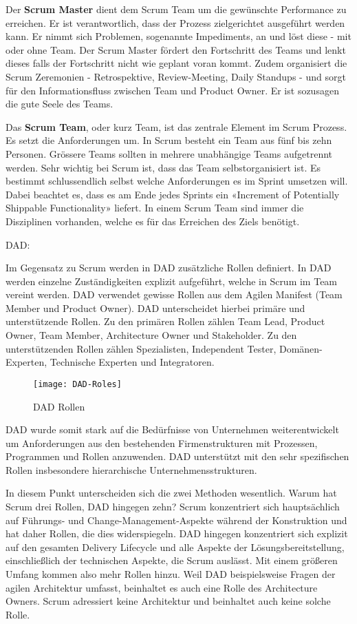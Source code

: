 Der \textbf{Scrum Master} dient dem Scrum Team um die gewünschte Performance zu erreichen. Er ist verantwortlich, dass der Prozess zielgerichtet ausgeführt werden kann. Er nimmt sich Problemen, sogenannte Impediments, an und löst diese - mit oder ohne Team. Der Scrum Master fördert den Fortschritt des Teams und lenkt dieses falls der Fortschritt nicht wie geplant voran kommt. Zudem organisiert die Scrum Zeremonien - Retrospektive, Review-Meeting, Daily Standups - und sorgt für den Informationsfluss zwischen Team und Product Owner. Er ist sozusagen die gute Seele des Teams. \medskip

Das \textbf{Scrum Team}, oder kurz Team, ist das zentrale Element im Scrum Prozess. Es setzt die Anforderungen um. In Scrum besteht ein Team aus fünf bis zehn Personen. Grössere Teams sollten in mehrere unabhängige Teams aufgetrennt werden. Sehr wichtig bei Scrum ist, dass das Team selbstorganisiert ist. Es bestimmt schlussendlich selbst welche Anforderungen es im Sprint umsetzen will. Dabei beachtet es, dass es am Ende jedes Sprints ein «Increment of  Potentially Shippable Functionality» liefert. In einem Scrum Team sind immer die Disziplinen vorhanden, welche es für das Erreichen des Ziels benötigt.
\bigskip 

{\Large DAD:} \medskip

Im Gegensatz zu Scrum werden in DAD zusätzliche Rollen definiert. In DAD werden einzelne Zuständigkeiten explizit aufgeführt, welche in Scrum im Team vereint werden. DAD verwendet gewisse Rollen aus dem Agilen Manifest (Team Member und Product Owner). DAD unterscheidet hierbei primäre und unterstützende Rollen. Zu den primären Rollen zählen Team Lead, Product Owner, Team Member, Architecture Owner und Stakeholder. Zu den unterstützenden Rollen zählen Spezialisten, Independent Tester, Domänen-Experten, Technische Experten und Integratoren.
\begin{figure}[H]
	\centering
	\texttt{[image: DAD-Roles]}
	\caption{DAD Rollen}
	\label{fig:dadrollen}
\end{figure}

DAD wurde somit stark auf die Bedürfnisse von Unternehmen weiterentwickelt um Anforderungen aus den bestehenden Firmenstrukturen mit Prozessen, Programmen und Rollen anzuwenden. DAD unterstützt mit den sehr spezifischen Rollen insbesondere hierarchische Unternehmensstrukturen.
\bigskip 


In diesem Punkt unterscheiden sich die zwei Methoden wesentlich. Warum hat Scrum drei Rollen, DAD hingegen zehn? Scrum konzentriert sich hauptsächlich auf Führungs- und Change-Management-Aspekte während der Konstruktion und hat daher Rollen, die dies widerspiegeln. DAD hingegen konzentriert sich explizit auf den gesamten Delivery Lifecycle und alle Aspekte der Lösungsbereitstellung, einschließlich der technischen Aspekte, die Scrum auslässt. Mit einem größeren Umfang kommen also mehr Rollen hinzu. Weil DAD beispielsweise Fragen der agilen Architektur umfasst, beinhaltet es auch eine Rolle des Architecture Owners. Scrum adressiert keine Architektur und beinhaltet auch keine solche Rolle.

